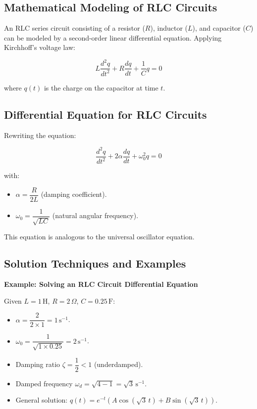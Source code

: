 \documentclass[12pt,a4paper]{article}
\begin{document}
\subsection{Mathematical Modeling of RLC Circuits}

An RLC series circuit consisting of a resistor (\( R \)), inductor (\( L \)), and capacitor (\( C \)) can be modeled by a second-order linear differential equation. Applying Kirchhoff's voltage law:

\[
L \frac{d^2 q}{dt^2} + R \frac{dq}{dt} + \dfrac{1}{C} q = 0
\]

where \( q(t) \) is the charge on the capacitor at time \( t \).

\subsection{Differential Equation for RLC Circuits}

Rewriting the equation:

\[
\frac{d^2 q}{dt^2} + 2 \alpha \frac{dq}{dt} + \omega_0^2 q = 0
\]

with:

\begin{itemize}
    \item \( \alpha = \dfrac{R}{2L} \) (damping coefficient).
    \item \( \omega_0 = \dfrac{1}{\sqrt{LC}} \) (natural angular frequency).
\end{itemize}

This equation is analogous to the universal oscillator equation.

\subsection{Solution Techniques and Examples}

\textbf{Example: Solving an RLC Circuit Differential Equation}

Given \( L = 1 \, \text{H} \), \( R = 2 \, \Omega \), \( C = 0.25 \, \text{F} \):

\begin{itemize}
    \item \( \alpha = \dfrac{2}{2 \times 1} = 1 \, \text{s}^{-1} \).
    \item \( \omega_0 = \dfrac{1}{\sqrt{1 \times 0.25}} = 2 \, \text{s}^{-1} \).
    \item Damping ratio \( \zeta = \dfrac{1}{2} < 1 \) (underdamped).
    \item Damped frequency \( \omega_d = \sqrt{4 - 1} = \sqrt{3} \, \text{s}^{-1} \).
    \item General solution: \( q(t) = e^{-t} \left( A \cos\left( \sqrt{3} \, t \right) + B \sin\left( \sqrt{3} \, t \right) \right) \).
\end{itemize}
\end{document}
